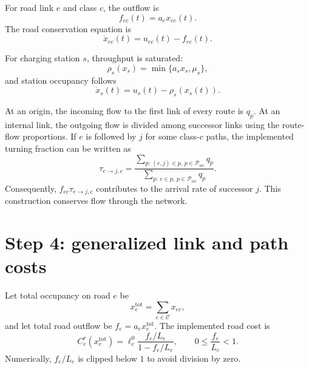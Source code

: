 \documentclass[11pt]{article}
\begin{document}
For road link $e$ and class $c$, the outflow is
\begin{equation}
    f_{ec}(t)=a_e x_{ec}(t).
\end{equation}
The road conservation equation is
\begin{equation}
    \dot{x}_{ec}(t)=u_{ec}(t)-f_{ec}(t).
    \label{eq:road-dynamics}
\end{equation}

For charging station $s$, throughput is saturated:
\begin{equation}
    \rho_s(x_s)=\min\{a_sx_s,\mu_s\},
    \label{eq:throughput}
\end{equation}
and station occupancy follows
\begin{equation}
    \dot{x}_s(t)=u_s(t)-\rho_s(x_s(t)).
    \label{eq:station-dynamics}
\end{equation}

At an origin, the incoming flow to the first link of every route is $q_p$.
At an internal link, the outgoing flow is divided among successor links using
the route-flow proportions. If $e$ is followed by $j$ for some class-$c$
paths, the implemented turning fraction can be written as
\begin{equation}
    \tau_{e\rightarrow j,c}
    =\frac{\sum_{p:\,(e,j)\in p,\,p\in\mathcal{P}_{wc}}q_p}
    {\sum_{p:\,e\in p,\,p\in\mathcal{P}_{wc}}q_p}.
\end{equation}
Consequently, $f_{ec}\tau_{e\rightarrow j,c}$ contributes to the arrival
rate of successor $j$. This construction conserves flow through the network.

\section{Step 4: generalized link and path costs}

Let total occupancy on road $e$ be
\begin{equation}
    x_e^{\mathrm{tot}}=\sum_{c\in\mathcal C}x_{ec},
\end{equation}
and let total road outflow be $f_e=a_ex_e^{\mathrm{tot}}$. The implemented
road cost is
\begin{equation}
    C_e^{r}(x_e^{\mathrm{tot}})
    =\ell_e^0
    \frac{f_e/L_e}{1-f_e/L_e},
    \qquad 0\leq \frac{f_e}{L_e}<1.
    \label{eq:road-cost}
\end{equation}
Numerically, $f_e/L_e$ is clipped below $1$ to avoid division by zero.
\end{document}
